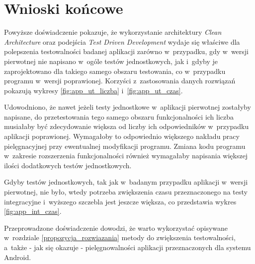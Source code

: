 \newpage
\section{Wnioski końcowe}
Powyższe doświadczenie pokazuje, że wykorzystanie architektury \textit{Clean Architecture} oraz podejścia \textit{Test Driven Development} wydaje się właściwe dla polepszenia testowalności badanej aplikacji zarówno w~przypadku, gdy w~wersji pierwotnej nie napisano w~ogóle testów jednostkowych, jak i~gdyby je zaprojektowano dla takiego samego obszaru testowania, co w~przypadku programu w~wersji poprawionej. Korzyści z~zastosowania danych rozwiązań pokazują wykresy \ref{fig:app_ut_liczba} i~\ref{fig:app_ut_czas}.

Udowodniono, że nawet jeżeli testy jednostkowe w~aplikacji pierwotnej zostałyby napisane, do przetestowania tego samego obszaru funkcjonalności ich liczba musiałaby być zdecydowanie większa od liczby ich odpowiedników w~przypadku aplikacji poprawionej. Wymagałoby to odpowiednio większego nakładu pracy pielęgnacyjnej przy ewentualnej modyfikacji programu. Zmiana kodu programu w~zakresie rozszerzenia funkcjonalności również wymagałaby napisania większej ilości dodatkowych testów jednostkowych.

Gdyby testów jednostkowych, tak jak w~badanym przypadku aplikacji w~wersji pierwotnej, nie było, wtedy potrzeba zwiększenia czasu przeznaczonego na testy integracyjne i~wyższego szczebla jest jeszcze większa, co przedstawia wykres \ref{fig:app_int_czas}.

Przeprowadzone doświadczenie dowodzi, że warto wykorzystać opisywane w~rozdziale \ref{propozycja_rozwiazania} metody do zwiększenia testowalności, a~także - jak się okazuje - pielęgnowalności aplikacji przeznaczonych dla systemu Android. 